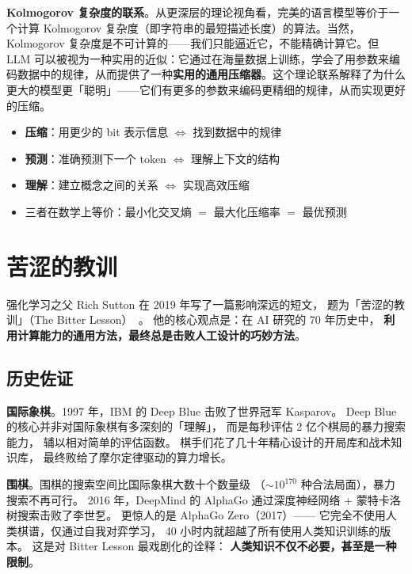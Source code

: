 \textbf{Kolmogorov 复杂度的联系}。从更深层的理论视角看，完美的语言模型等价于一个计算 Kolmogorov 复杂度（即字符串的最短描述长度）的算法。当然，Kolmogorov 复杂度是不可计算的——我们只能逼近它，不能精确计算它。但 LLM 可以被视为一种实用的近似：它通过在海量数据上训练，学会了用参数来编码数据中的规律，从而提供了一种\textbf{实用的通用压缩器}。这个理论联系解释了为什么更大的模型更「聪明」——它们有更多的参数来编码更精细的规律，从而实现更好的压缩。

\begin{keybox}[压缩--预测--理解 三位一体]
\begin{itemize}[noitemsep]
  \item \textbf{压缩}：用更少的 bit 表示信息 $\Leftrightarrow$ 找到数据中的规律
  \item \textbf{预测}：准确预测下一个 token $\Leftrightarrow$ 理解上下文的结构
  \item \textbf{理解}：建立概念之间的关系 $\Leftrightarrow$ 实现高效压缩
  \item 三者在数学上等价：最小化交叉熵 $=$ 最大化压缩率 $=$ 最优预测
\end{itemize}
\end{keybox}

\section{苦涩的教训}

强化学习之父 Rich Sutton 在 2019 年写了一篇影响深远的短文，
题为「苦涩的教训」（The Bitter Lesson）~\cite{sutton2019bitterlesson}。
他的核心观点是：在 AI 研究的 70 年历史中，
\textbf{利用计算能力的通用方法，最终总是击败人工设计的巧妙方法}。

\subsection{历史佐证}

\textbf{国际象棋}。1997 年，IBM 的 Deep Blue 击败了世界冠军 Kasparov。
Deep Blue 的核心并非对国际象棋有多深刻的「理解」，
而是每秒评估 2 亿个棋局的暴力搜索能力，
辅以相对简单的评估函数。
棋手们花了几十年精心设计的开局库和战术知识库，
最终败给了摩尔定律驱动的算力增长。

\textbf{围棋}。围棋的搜索空间比国际象棋大数十个数量级
（$\sim 10^{170}$ 种合法局面），暴力搜索不再可行。
2016 年，DeepMind 的 AlphaGo 通过深度神经网络 + 蒙特卡洛树搜索击败了李世乭。
更惊人的是 AlphaGo Zero（2017）——
它完全不使用人类棋谱，仅通过自我对弈学习，
40 小时内就超越了所有使用人类知识训练的版本。
这是对 Bitter Lesson 最戏剧化的诠释：
\textbf{人类知识不仅不必要，甚至是一种限制}。

